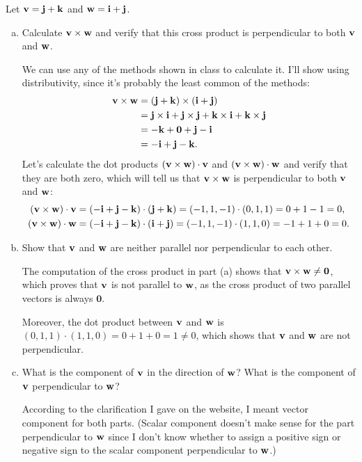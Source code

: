 \begin{problem}
  Let $\mathbf v=\mathbf j+\mathbf k$ and $\mathbf w=\mathbf i+\mathbf j$.
  \begin{enumerate}[(a)]
    \item  Calculate $\mathbf v\times\mathbf w$ and verify that this cross product is perpendicular to both $\mathbf v$ and $\mathbf w$.
    \begin{solution}
      We can use any of the methods shown in class to calculate it. I'll show using distributivity, since it's probably the least common of the methods:
      \[\begin{split}
        \mathbf v\times\mathbf w &=(\mathbf j+\mathbf k)\times(\mathbf i+\mathbf j) \\
        &= \mathbf j\times\mathbf i+\mathbf j\times\mathbf j+\mathbf k\times\mathbf i+\mathbf k\times\mathbf j\\
        &= -\mathbf k+\mathbf 0+\mathbf j-\mathbf i\\
        &= -\mathbf i+\mathbf j-\mathbf k.
      \end{split}\]
      Let's calculate the dot products $(\mathbf v\times\mathbf w)\cdot\mathbf v$ and $(\mathbf v\times\mathbf w)\cdot\mathbf w$ and verify that they are both zero, which will tell us that $\mathbf v\times\mathbf w$ is perpendicular to both $\mathbf v$ and $\mathbf w$:
      \begin{align*}
        (\mathbf v\times\mathbf w)\cdot\mathbf v &= (-\mathbf i+\mathbf j-\mathbf k)\cdot(\mathbf j+\mathbf k)=(-1,1,-1)\cdot(0,1,1)=0+1-1=0,\\
        (\mathbf v\times\mathbf w)\cdot\mathbf w &= (-\mathbf i+\mathbf j-\mathbf k)\cdot(\mathbf i+\mathbf j)=(-1,1,-1)\cdot(1,1,0)=-1+1+0=0.
      \end{align*}
    \end{solution}
    \item Show that $\mathbf v$ and $\mathbf w$ are neither parallel nor perpendicular to each other.
    \begin{solution}
      The computation of the cross product in part (a) shows that $\mathbf v\times\mathbf w\neq\mathbf 0$, which proves that $\mathbf v$ is not parallel to $\mathbf w$, as the cross product of two parallel vectors is always $\mathbf 0$.

      Moreover, the dot product between $\mathbf v$ and $\mathbf w$ is $(0,1,1)\cdot(1,1,0)=0+1+0=1\neq 0$, which shows that $\mathbf v$ and $\mathbf w$ are not perpendicular.
    \end{solution}
    \item What is the component of $\mathbf v$ in the direction of $\mathbf w$? What is the component of $\mathbf v$ perpendicular to $\mathbf w$?
    \begin{solution}
      According to the clarification I gave on the website, I meant vector component for both parts. (Scalar component doesn't make sense for the part perpendicular to $\mathbf w$ since I don't know whether to assign a positive sign or negative sign to the scalar component perpendicular to $\mathbf w$.)


\end{solution}
\end{enumerate}
\end{problem}

